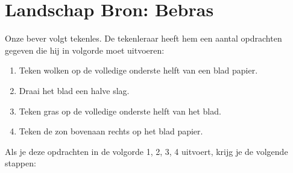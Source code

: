 \documentclass[12pt, a4paper]{article}
\begin{document}
	
	\def\Arrow{{\scalebox{4}{$\Rightarrow$}}}
	\def\Image#1{\raisebox{-.5\height}{\texttt{[image: \#1]}}}
	
	\begin{minipage}{\textwidth}
		\section{Landschap \hfill\small Bron: Bebras}

			
			Onze bever volgt tekenles. De tekenleraar heeft hem een aantal opdrachten gegeven die hij in volgorde moet uitvoeren:
			\begin{enumerate}
				\item Teken wolken op de volledige onderste helft van een blad papier.
				\item Draai het blad een halve slag.
				\item Teken gras op de volledige onderste helft van het blad.
				\item Teken de zon bovenaan rechts op het blad papier.
			\end{enumerate}
			Als je deze opdrachten in de volgorde 1, 2, 3, 4 uitvoert, krijg je de volgende stappen:


\end{minipage}
\end{document}
